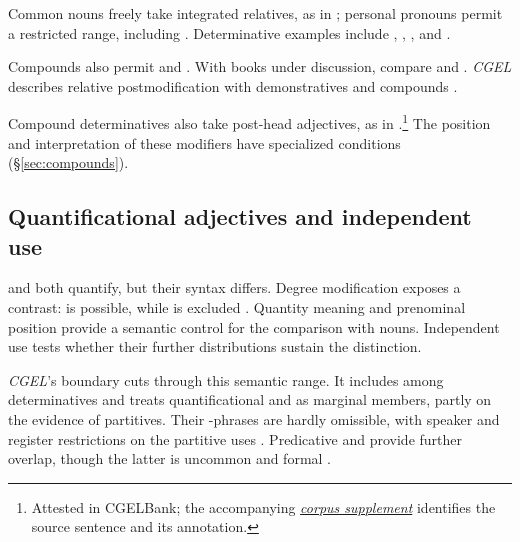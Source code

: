 \documentclass[12pt]{article}
\begin{document}
Common nouns freely take integrated relatives, as in ; personal pronouns permit a restricted range, including  \citep[430]{huddleston2002}. Determinative examples include , , , and .

Compounds also permit  and . With books under discussion, compare  and . \textit{CGEL} describes relative postmodification with demonstratives and compounds \citep[414, 422--423]{huddleston2002}.

Compound determinatives also take post-head adjectives, as in .\footnote{Attested in CGELBank; the accompanying \href{run:corpus-documentation.pdf}{\textit{corpus supplement}} identifies the source sentence and its annotation.} The position and interpretation of these modifiers have specialized conditions (§\ref{sec:compounds}).

\subsection{Quantificational adjectives and independent use}\label{sec:quant-controls}

 and  both quantify, but their syntax differs. Degree modification exposes a contrast:  is possible, while  is excluded \citep[539--540]{huddleston2002}. Quantity meaning and prenominal position provide a semantic control for the comparison with nouns. Independent use tests whether their further distributions sustain the distinction.

\textit{CGEL}'s boundary cuts through this semantic range. It includes  among determinatives and treats quantificational  and  as marginal members, partly on the evidence of partitives. Their -phrases are hardly omissible, with speaker and register restrictions on the partitive uses \citep[392--393, 411--413]{huddleston2002}. Predicative  and  provide further overlap, though the latter is uncommon and formal \citep[392, 395--396]{huddleston2002}.
\end{document}

